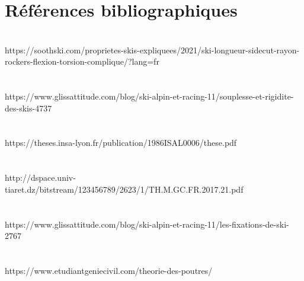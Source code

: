 \documentclass[12pt, a4paper]{article}
\begin{document}
\section{\textbf{Références bibliographiques}}
\noindent
\\
https://soothski.com/proprietes-skis-expliquees/2021/ski-longueur-sidecut-rayon-rockers-flexion-torsion-complique/?lang=fr \\\\\\
https://www.glissattitude.com/blog/ski-alpin-et-racing-11/souplesse-et-rigidite-des-skis-4737 \\\\\\
https://theses.insa-lyon.fr/publication/1986ISAL0006/these.pdf\\\\\\
http://dspace.univ-tiaret.dz/bitstream/123456789/2623/1/TH.M.GC.FR.2017.21.pdf \\\\\\
https://www.glissattitude.com/blog/ski-alpin-et-racing-11/les-fixations-de-ski-2767 \\\\\\
https://www.etudiantgeniecivil.com/theorie-des-poutres/ \\\\\\
\end{document}
